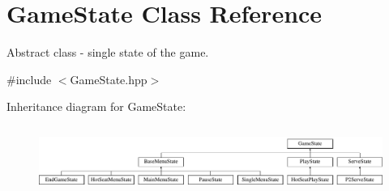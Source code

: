 \hypertarget{class_game_state}{}\section{Game\+State Class Reference}
\label{class_game_state}


Abstract class -\/ single state of the game.  




{\ttfamily \#include $<$Game\+State.\+hpp$>$}

Inheritance diagram for Game\+State\+:\begin{figure}[H]
\begin{center}
\leavevmode
\includegraphics[height=2.258065cm]{class_game_state}
\end{center}
\end{figure}
